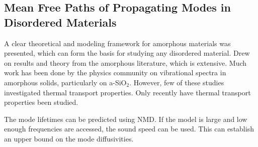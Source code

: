 

\subsection{\label{Overview:MFP}
Mean Free Paths of Propagating Modes in Disordered Materials}

A clear theoretical and modeling framework for amorphous materials was 
presented, which can form the basis for studying any disordered material. 
Drew on results and theory from the amorphous literature, which 
is extensive. 
Much work has been done by the physics community on vibrational spectra 
in amorphous solids, particularly on a-SiO$_2$. However, few of these 
studies investigated thermal transport properties. Only recently 
have thermal transport properties been studied.\cite{}

The mode lifetimes can be predicted using NMD.
If the model is large and low enough frequencies are accessed, the sound 
speed can be used. This can establish an upper bound on the mode 
diffusivities. 

